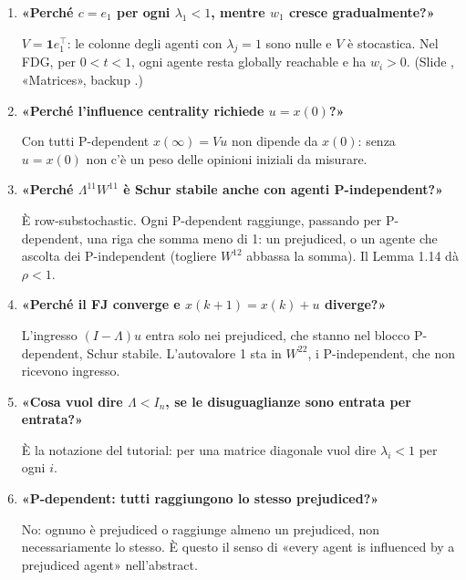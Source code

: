 \documentclass[a4paper,10pt]{article}
\newcommand{\fr}[1]{\getrefnumber{P-#1}}      %
\newcommand{\uno}{\mathbf{1}}
\newcommand{\D}[2]{\item \textbf{«#1»}\par #2}
\begin{document}
\begin{enumerate}[resume*=fj]
  \D{Perché $c=e_1$ per ogni $\lambda_1<1$, mentre $w_1$ cresce gradualmente?}{$V=\uno e_1^\top$: le colonne degli agenti con $\lambda_j=1$ sono nulle e $V$ è stocastica. Nel FDG, per $0<t<1$, ogni agente resta globally reachable e ha $w_i>0$. (Slide \fr{m-one-prej}, «Matrices», backup \fr{bk-one-prej}.)}
  \D{Perché l'influence centrality richiede $u=x(0)$?}{Con tutti P-dependent $x(\infty)=Vu$ non dipende da $x(0)$: senza $u=x(0)$ non c'è un peso delle opinioni iniziali da misurare.}
  \D{Perché $\Lambda^{11}W^{11}$ è Schur stabile anche con agenti P-independent?}{È row-substochastic. Ogni P-dependent raggiunge, passando per P-dependent, una riga che somma meno di 1: un prejudiced, o un agente che ascolta dei P-independent (togliere $W^{12}$ abbassa la somma). Il Lemma 1.14 dà $\rho<1$.}
  \D{Perché il FJ converge e $x(k+1)=x(k)+u$ diverge?}{L'ingresso $(I-\Lambda)u$ entra solo nei prejudiced, che stanno nel blocco P-dependent, Schur stabile. L'autovalore 1 sta in $W^{22}$, i P-independent, che non ricevono ingresso.}
  \D{Cosa vuol dire $\Lambda<I_n$, se le disuguaglianze sono entrata per entrata?}{È la notazione del tutorial: per una matrice diagonale vuol dire $\lambda_i<1$ per ogni $i$.}
  \D{P-dependent: tutti raggiungono lo stesso prejudiced?}{No: ognuno è prejudiced o raggiunge almeno un prejudiced, non necessariamente lo stesso. È questo il senso di «every agent is influenced by a prejudiced agent» nell'abstract.}
\end{enumerate}
\end{document}
